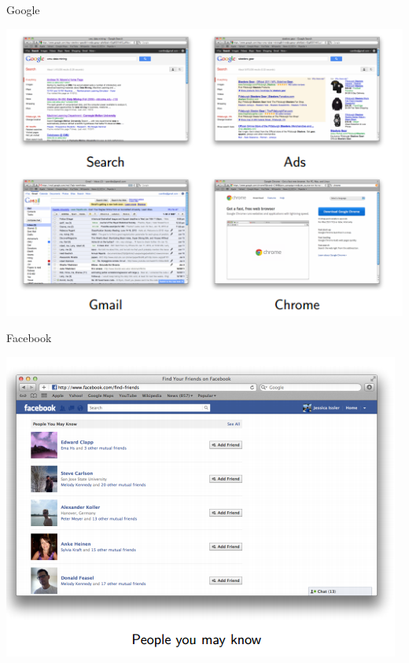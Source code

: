 \documentclass{beamer}
\begin{document}
\begin{frame}{Google}
    \begin{center}
        \includegraphics[scale=0.5]{google.png}
    \end{center}
\end{frame}
\begin{frame}{Facebook}
    \begin{center}
        \includegraphics[scale=0.5]{facebook.png}
    \end{center}
\end{frame}
\end{document}
